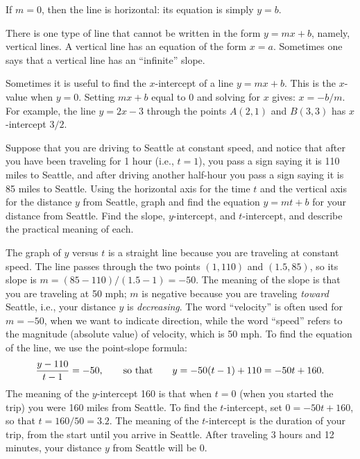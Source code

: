 If $m=0$, then the line is horizontal: its equation is simply $y=b$.


There is one type of line that cannot be written in the form $y=mx+b$,
namely, vertical lines.  A vertical line has an equation of the form $x=a$.
Sometimes one says that a vertical line has an ``infinite'' slope.


Sometimes it is useful to find the $x$-intercept of a line $y=mx+b$.  This is
the $x$-value when $y=0$.  Setting $mx+b$ equal to 0 and solving for
$x$ gives: $x=-b/m$.  For example, the line $y=2x-3$ through the points
$A(2,1)$ and $B(3,3)$ has $x$-intercept $3/2$.


\begin{example} Suppose that you are driving to Seattle at constant speed, and
notice that after you have been traveling for 1 hour (i.e., $t=1$),
you pass a sign saying it is 110 miles to Seattle, and after driving
another half-hour you pass a sign saying it is 85 miles to Seattle.  Using
the horizontal axis for the time $t$ and the vertical axis for the
distance $y$ from Seattle, graph and find the equation $y=mt+b$ for
your distance from Seattle.  Find the slope, $y$-intercept, and
$t$-intercept, and describe the practical meaning of each.

The graph of $y$ versus $t$ is a straight line because you are traveling
at constant speed.  The line passes through the two points $(1,110)$ and
$(1.5,85)$, so its slope is $m=(85-110)/(1.5-1)=-50$.  The meaning of the
slope is that you are traveling at 50 mph; $m$ is negative because you are
traveling {\it toward\/} Seattle, i.e., your distance $y$ is {\it
decreasing}.  The word ``velocity'' is often used for $m=-50$, when we want
to indicate direction, while the word ``speed'' refers to the magnitude
(absolute value) of velocity, which is 50 mph.  To find the equation of the
line, we use the point-slope formula:
$$
    {y-110\over t-1}=-50,\qquad\hbox{so~that}\qquad y=-50(t-1)+110=-50t+160.
$$ 
The meaning of the $y$-intercept 160 is that when $t=0$ (when you
started the trip) you were 160 miles from Seattle.  To find the
$t$-intercept, set $0=-50t+160$, so that $t=160/50=3.2$.  The meaning
of the $t$-intercept is the duration of your trip, from the start
until you arrive in Seattle.
After traveling 3 hours and 12 minutes, your distance $y$ from Seattle will be
0.  
\end{example} 
\label{example:drive to Seattle}

